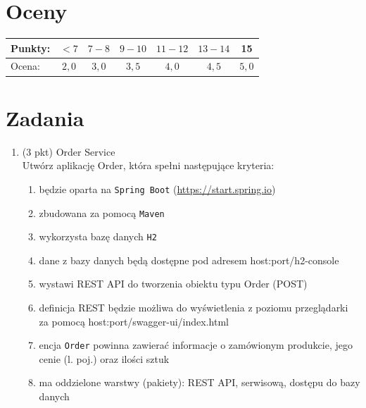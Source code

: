 \documentclass[12pt]{article}
\begin{document}
    \section*{Oceny}
    \begin{tabular}{|l|c|c|c|c|c|c|}
        \hline
        Punkty: & $<7$ & $7-8$ & $9-10$ & $11-12$ & $13-14$ & 15\\
        \hline
        Ocena: & $2,0$ & $3,0$ & $3,5$ & $4,0$ & $4,5$ & $5,0$\\
        \hline
    \end{tabular}

    \section*{Zadania}
    \begin{enumerate}
        \item\label{exc:order_service}
            (3 pkt) Order Service\\
            Utwórz aplikację Order, która spełni następujące kryteria:
            \begin{enumerate}
                \item będzie oparta na \texttt{Spring Boot} (\url{https://start.spring.io})
                \item zbudowana za pomocą \texttt{Maven}
                \item wykorzysta bazę danych \texttt{H2} 
                \item dane z bazy danych będą dostępne pod adresem host:port/h2-console
                \item wystawi REST API do tworzenia obiektu typu Order (POST)
                \item definicja REST będzie możliwa do wyświetlenia z poziomu przeglądarki za pomocą host:port/swagger-ui/index.html
                \item encja \texttt{Order} powinna zawierać informacje o zamówionym produkcie, jego cenie (l. poj.) oraz ilości sztuk
                \item ma oddzielone warstwy (pakiety): REST API, serwisową, dostępu do bazy danych
            \end{enumerate}


\end{enumerate}
\end{document}
